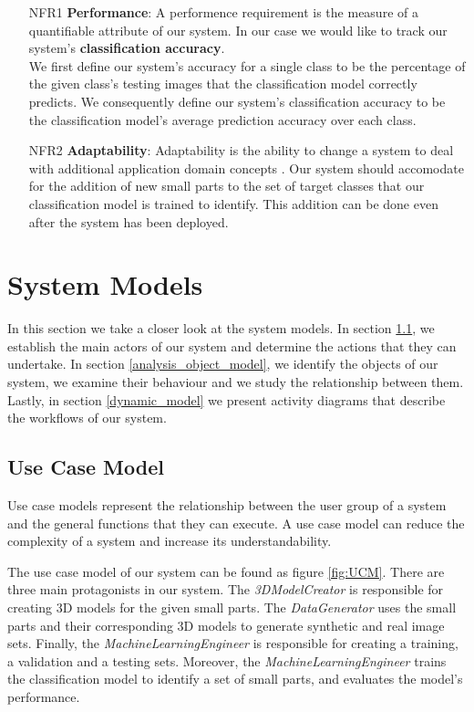 \begin{itemize}
  \item [NFR1] \textbf{Performance}: A performence requirement is the measure of a quantifiable attribute of our system. In our case we would like to track our system's \textbf{classification accuracy}.
  \\We first define our system's accuracy for a single class to be the percentage of the given class's testing images that the classification model correctly predicts. We consequently define our system's classification accuracy to be the classification model's average prediction accuracy over each class.

  \item [NFR2] \textbf{Adaptability}: Adaptability is the ability to change a system to deal with additional application domain concepts \cite{bruegge2004object}. Our system should accomodate for the addition of new small parts to the set of target classes that our classification model is trained to identify. This addition can be done even after the system has been deployed.
\end{itemize}


\section{System Models}\label{system_models}

In this section we take a closer look at the system models. In section \ref{use_case_model}, we establish the main actors of our system and determine the actions that they can undertake. In section \ref{analysis_object_model}, we identify the objects of our system, we examine their behaviour and we study the relationship between them. Lastly, in section \ref{dynamic_model} we present activity diagrams that describe the workflows of our system.

\subsection{Use Case Model}\label{use_case_model}
Use case models represent the relationship between the user group of a system and the general functions that they can execute. A use case model can reduce the complexity of a system and increase its understandability.

The use case model of our system can be found as figure \ref{fig:UCM}. There are three main protagonists in our system. The \textit{3DModelCreator} is responsible for creating 3D models for the given small parts. The \textit{DataGenerator} uses the small parts and their corresponding 3D models to generate synthetic and real image sets. Finally, the \textit{MachineLearningEngineer} is responsible for creating a training, a validation and a testing sets. Moreover, the \textit{MachineLearningEngineer} trains the classification model to identify a set of small parts, and evaluates the model's performance.

